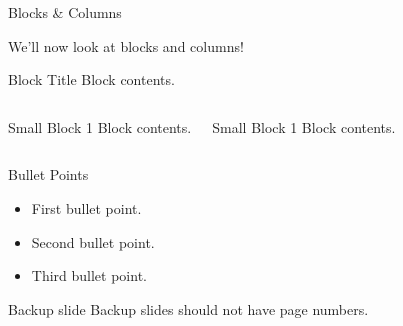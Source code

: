 \documentclass[noamssymb,noamsmath,aspectratio=169,9pt]{beamer}
\begin{document}
\begin{frame}{Blocks \& Columns}

  We'll now look at blocks and columns!
  \pause

  \begin{block}{Block Title}
    Block contents.
  \end{block}

  \pause
  \begin{columns}
    \begin{block}{Small Block 1}
      Block contents.
    \end{block}

    \begin{block}{Small Block 1}
      Block contents.
    \end{block}
  \end{columns}
\end{frame}

\begin{frame}{Bullet Points}

\begin{itemize}
  \item First bullet point.
    \pause
  \item Second bullet point.
    \pause
  \item Third bullet point.
\end{itemize}
\end{frame}

\begin{frame}{Backup slide}
  Backup slides should not have page numbers.
\end{frame}
\end{document}
